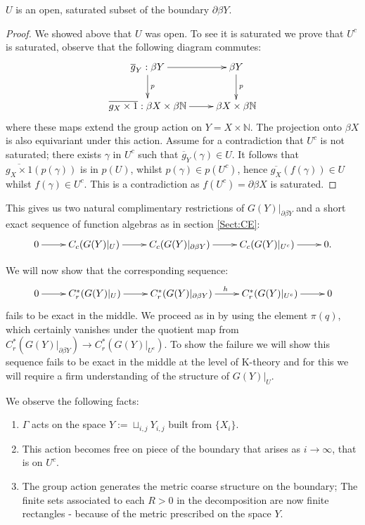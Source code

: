 \begin{example}
\begin{lemma}
$U$ is an open, saturated subset of the boundary $\partial\beta Y$. 
\end{lemma}
\begin{proof}
We showed above that $U$ was open. To see it is saturated we prove that $U^{c}$ is saturated, observe that the following diagram commutes:
\begin{equation*}
\xymatrix{
\overline{g}_{Y}:\beta Y\ar[r]\ar[d]^{p} & \beta Y\ar[d]^{p}\\
\overline{g_{X} \times 1}:  \beta X \times \beta \mathbb{N} \ar[r] & \beta X \times \beta \mathbb{N}
}
\end{equation*}
where these maps extend the group action on $Y=X \times \mathbb{N}$. The projection onto $\beta X$ is also equivariant under this action. Assume for a contradiction that $U^{c}$ is not saturated; there exists $\gamma$ in $U^{c}$ such that $\overline{g}_{Y}(\gamma) \in U$. It follows that $\overline{g_{X} \times 1}(p(\gamma))$ is in $p(U)$, whilst $p(\gamma) \in p(U^{c})$, hence $\overline{g_{X}}(f(\gamma))\in U$ whilst $f(\gamma) \in U^{c}$. This is a contradiction as $f(U^{c}) = \partial\beta X$ is saturated.
\end{proof}

This gives us two natural complimentary restrictions of $G(Y)|_{\partial\beta Y}$ and a short exact sequence of function algebras as in section \ref{Sect:CE}:
\begin{equation*}
\xymatrix{
0 \ar[r] & C_{c}(G(Y)|_{U}) \ar[r]& C_{c}(G(Y)|_{\partial\beta Y}) \ar[r] & C_{c}(G(Y)|_{U^{c}}) \ar[r] & 0.
}
\end{equation*}

We will now show that the corresponding sequence:
\begin{equation*}
\xymatrix{
0 \ar[r] & C^{*}_{r}(G(Y)|_{U}) \ar[r]& C_{r}^{*}(G(Y)|_{\partial\beta Y}) \ar[r]^{h} & C_{r}^{*}(G(Y)|_{U^{c}}) \ar[r] & 0
}
\end{equation*}
fails to be exact in the middle. We proceed as in \cite{explg1,MR1911663} by using the element $\pi(q)$, which certainly vanishes under the quotient map from $C^{*}_{r}(G(Y)|_{\partial\beta Y}) \rightarrow C^{*}_{r}(G(Y)|_{U^{c}})$. To show the failure we will show this sequence fails to be exact in the middle at the level of K-theory and for this we will require a firm understanding of the structure of $G(Y)|_{U}$.

We observe the following facts: 
\begin{enumerate}
\item $\Gamma$ acts on the space $Y:=\sqcup_{i,j}Y_{i,j}$ built from $\lbrace X_{i} \rbrace$.
\item This action becomes free on piece of the boundary that arises as $i \rightarrow \infty$, that is on $U^{c}$.
\item The group action generates the metric coarse structure on the boundary; The finite sets associated to each $R>0$ in the decomposition are now finite rectangles - because of the metric prescribed on the space $Y$.
\end{enumerate} 


\end{example}

